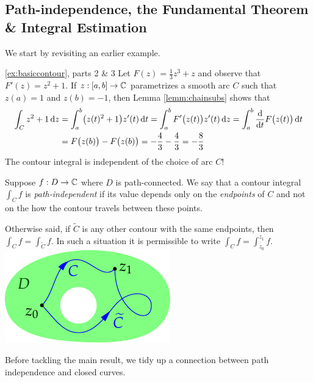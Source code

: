 \subsection{Path-independence, the Fundamental Theorem \& Integral Estimation}

We start by revisiting an earlier example.

\begin{example*}{\ref{ex:basiccontour}, parts 2 \& 3}{}
Let $F(z)=\frac 13z^3+z$ and observe that $F'(z)=z^2+1$. If $z:[a,b]\to \mathbb{C}$ parametrizes a smooth arc $C$ such that $z(a)=1$ and $z(b)=-1$, then Lemma \ref{lemm:chainsubs} shows that
\begin{align*}
\int_Cz^2+1\,{\mathrm{d} z}&=\int_a^b\bigl(z(t)^2+1\bigr)z'(t)\,{\mathrm{d} t} =\int_a^bF'\bigl(z(t)\bigr)z'(t)\,{\mathrm{d} z} =\int_a^b\frac{\mathrm{d} }{\mathrm{d} t}F\bigl(z(t)\bigr)\,{\mathrm{d} t}\\
&=F\bigl(z(b)\bigr)-F\bigl(z(b)\bigr) = -\frac 43-\frac 43=-\frac 83
\end{align*}
The contour integral is independent of the choice of arc $C$!
\end{example*}

\begin{defn}[lower separated=false, sidebyside, sidebyside align=top seam, sidebyside gap=0pt, righthand width=0.32\linewidth]{}{}
Suppose $f:D\to\mathbb{C}$ where $D$ is path-connected. We say that a contour integral $\int_Cf$ is \emph{path-independent} if its value depends only on the \emph{endpoints} of $C$ and not on the how the contour travels between these points.\par
Otherwise said, if $\widetilde C$ is any other contour with the same endpoints, then $\int_Cf=\int_{\widetilde C}f$.\smallbreak
In such a situation it is permissible to write $\int_Cf=\int_{z_0}^{z_1}f$.
\tcblower
\flushright\includegraphics{ftc-5}
\end{defn}

Before tackling the main result, we tidy up a connection between path independence and closed curves.

